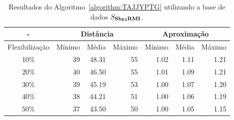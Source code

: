 \begin{table}[!htb]
  \caption{Resultados do Algoritmo~\ref{algorithm:TAJJYPTG} utilizando a base de dados $S_{\textbf{Sb\textsubscript{FI}RMI}}{}$.}
  \label{table:NNPRKQHC}
  \centering
  \begin{tabular}{|c|r|r|r|r|r|r|}
    \hline
      -            & \multicolumn{3}{c|}{Distância}             & \multicolumn{3}{c|}{Aproximação}           \\ \hline
    Flexibilização & Mínimo       & Média        & Máximo       & Mínimo       & Média        & Máximo       \\ \hline  
    10\%           & 39           & 48.31        & 55           & 1.02         & 1.11         & 1.21         \\ \hline
    20\%           & 40           & 46.50        & 55           & 1.01         & 1.09         & 1.21         \\ \hline
    30\%           & 39           & 45.19        & 53           & 1.00         & 1.07         & 1.20         \\ \hline
    40\%           & 38           & 44.21        & 51           & 1.00         & 1.06         & 1.19         \\ \hline
    50\%           & 37           & 43.50        & 50           & 1.00         & 1.05         & 1.15         \\ \hline    
  \end{tabular}
\end{table}